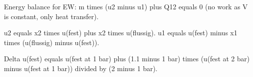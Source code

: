 Energy balance for EW:  
m times (u2 minus u1) plus Q12 equals 0 (no work as V is constant, only heat transfer).  

u2 equals x2 times u(fest) plus x2 times u(flussig).  
u1 equals u(fest) minus x1 times (u(flussig) minus u(fest)).  

Delta u(fest) equals u(fest at 1 bar) plus (1.1 minus 1 bar) times (u(fest at 2 bar) minus u(fest at 1 bar)) divided by (2 minus 1 bar).